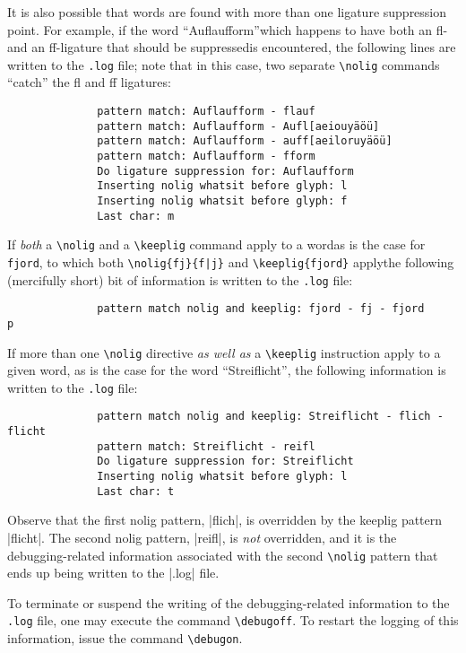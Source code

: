 \documentclass[11pt]{article}
\newcommand{\opt}[1]{\texttt{#1}}
\newcommand{\cmmd}[1]{\texttt{\textbackslash #1}}
\begin{document}
It is also possible that words are found with more than one ligature suppression point. For example, if the word \enquote{Auflaufform}\textemdash which happens to have both an fl- and an ff-ligature that should be suppressed\textemdash is encountered, the following lines are written to the \opt{.log} file; note that in this case, two separate \cmmd{nolig} commands \enquote{catch} the fl and ff ligatures:
\begin{Verbatim}
              pattern match: Auflaufform - flauf
              pattern match: Auflaufform - Aufl[aeiouyäöü]
              pattern match: Auflaufform - auff[aeiloruyäöü]
              pattern match: Auflaufform - fform
              Do ligature suppression for: Auflaufform
              Inserting nolig whatsit before glyph: l
              Inserting nolig whatsit before glyph: f
              Last char: m
\end{Verbatim}

If \emph{both} a \cmmd{nolig} and a \cmmd{keeplig} command apply to a word\textemdash as is the case for \opt{fjord}, to which both \Verb+\nolig{fj}{f|j}+ and \Verb+\keeplig{fjord}+ apply\textemdash the following (mercifully short) bit of information is written to the \opt{.log} file:
\begin{Verbatim}
              pattern match nolig and keeplig: fjord - fj - fjord
p\end{Verbatim}

If more than one \cmmd{nolig} directive \emph{as well as} a \cmmd{keeplig} instruction apply to a given word, as is the case for the word \enquote{Streiflicht}, the following information is written to the \opt{.log} file:
\begin{Verbatim}
              pattern match nolig and keeplig: Streiflicht - flich - flicht
              pattern match: Streiflicht - reifl
              Do ligature suppression for: Streiflicht
              Inserting nolig whatsit before glyph: l
              Last char: t
              \end{Verbatim}
Observe that the first nolig pattern, |flich|, is overridden by the keeplig pattern |flicht|. The second nolig pattern, |reifl|, is \emph{not} overridden, and it is the debugging-related information associated with the second \cmmd{nolig} pattern that ends up being written to the |.log| file. 

To terminate or suspend the writing of the debugging-related information to the \opt{.log} file, one may execute the command \cmmd{debugoff}. To restart the logging of this information, issue the command \cmmd{debugon}.
\end{document}
